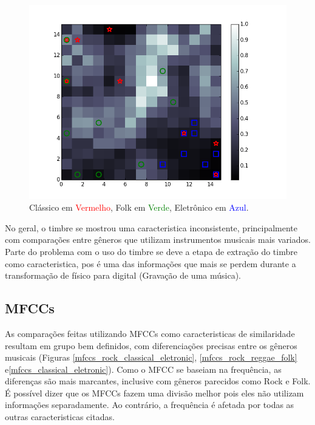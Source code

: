 \documentclass[journal]{IEEEtran}
\begin{document}
\begin{figure}[H]
\centering
\includegraphics[scale=0.5]{images/timbre_classical_reggae_eletronic.png}
\caption{Clássico em \textcolor{red}{Vermelho}, Folk em \textcolor{green}{Verde}, Eletrônico em \textcolor{blue}{Azul}.}\label{timbre_classical_reggae_eletronic}
\end{figure}

No geral, o timbre se mostrou uma caracteristica inconsistente, principalmente com comparações entre gêneros que utilizam instrumentos musicais mais variados. Parte do problema com o uso do timbre se deve a etapa de extração do timbre como caracteristica, pos é uma das informações que mais se perdem durante a transformação de físico para digital (Gravação de uma música).

\subsection{MFCCs}
As comparações feitas utilizando MFCCs como caracteristicas de similaridade resultam em grupo bem definidos, com diferenciações precisas entre os gêneros musicais (Figuras \ref{mfccs_rock_classical_eletronic}, \ref{mfccs_rock_reggae_folk} e\ref{mfccs_classical_eletronic}). Como o MFCC se baseiam na frequência, as diferenças são mais marcantes, inclusive com gêneros parecidos como Rock e Folk.
É possível dizer que os MFCCs fazem uma divisão melhor pois eles não utilizam informações separadamente. Ao contrário, a frequência é afetada por todas as outras caracteristicas citadas.
\end{document}
